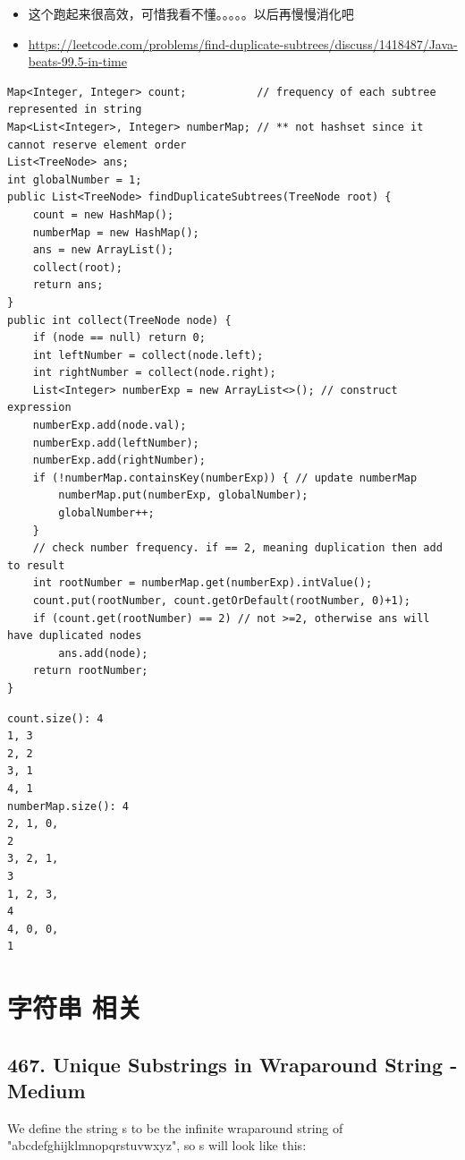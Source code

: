 \documentclass[9pt, b5paper]{article}
\begin{document}
\begin{itemize}
\item 这个跑起来很高效，可惜我看不懂。。。。。以后再慢慢消化吧
\item \url{https://leetcode.com/problems/find-duplicate-subtrees/discuss/1418487/Java-beats-99.5-in-time}
\end{itemize}
\begin{verbatim}
Map<Integer, Integer> count;           // frequency of each subtree represented in string
Map<List<Integer>, Integer> numberMap; // ** not hashset since it cannot reserve element order
List<TreeNode> ans;
int globalNumber = 1;
public List<TreeNode> findDuplicateSubtrees(TreeNode root) {
    count = new HashMap();
    numberMap = new HashMap();
    ans = new ArrayList();
    collect(root);
    return ans;
}
public int collect(TreeNode node) {
    if (node == null) return 0;
    int leftNumber = collect(node.left);
    int rightNumber = collect(node.right);
    List<Integer> numberExp = new ArrayList<>(); // construct expression
    numberExp.add(node.val);
    numberExp.add(leftNumber);
    numberExp.add(rightNumber);
    if (!numberMap.containsKey(numberExp)) { // update numberMap
        numberMap.put(numberExp, globalNumber);
        globalNumber++;
    }
    // check number frequency. if == 2, meaning duplication then add to result
    int rootNumber = numberMap.get(numberExp).intValue();
    count.put(rootNumber, count.getOrDefault(rootNumber, 0)+1);
    if (count.get(rootNumber) == 2) // not >=2, otherwise ans will have duplicated nodes
        ans.add(node);
    return rootNumber;
}
\end{verbatim}
\begin{verbatim}
count.size(): 4
1, 3
2, 2
3, 1
4, 1
numberMap.size(): 4
2, 1, 0,
2
3, 2, 1,
3
1, 2, 3,
4
4, 0, 0,
1
\end{verbatim}

\section{字符串 相关}
\label{sec-16}
\subsection{467. Unique Substrings in Wraparound String - Medium}
\label{sec-16-1}
We define the string s to be the infinite wraparound string of "abcdefghijklmnopqrstuvwxyz", so s will look like this:
\end{document}
